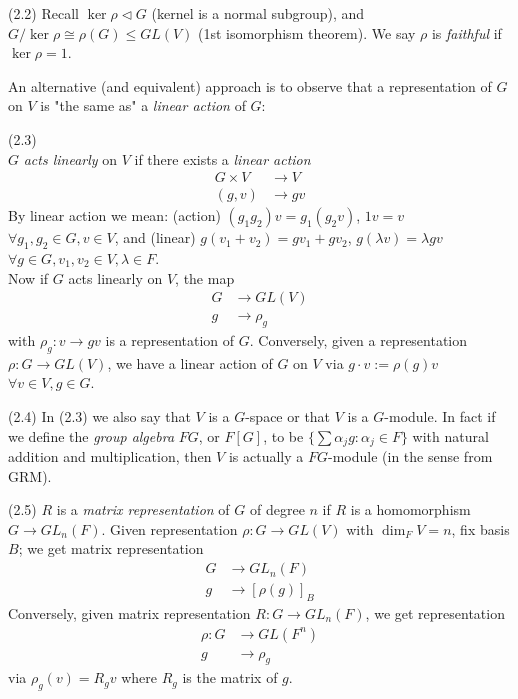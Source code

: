\documentclass[a4paper]{article}
\begin{document}
(2.2) Recall $\ker \rho \triangleleft G$ (kernel is a normal subgroup), and $G/\ker \rho \cong \rho(G) \leq GL(V)$ (1st isomorphism theorem). We say $\rho$ is \emph{faithful} if $\ker \rho = 1$.

An alternative (and equivalent) approach is to observe that a representation of $G$ on $V$ is "the same as" a \emph{linear action} of $G$:

\begin{defi} (2.3)\\
$G$ \emph{acts linearly} on $V$ if there exists a \emph{linear action}
\begin{equation*}
\begin{aligned}
G \times V &\to V\\
(g,v) &\to gv
\end{aligned}
\end{equation*}
By linear action we mean: (action) $(g_1 g_2) v = g_1(g_2 v)$, $1v=v$ $\forall g_1,g_2 \in G, v \in V$, and (linear) $g(v_1+v_2) = gv_1+gv_2$, $g(\lambda v) = \lambda gv$ $\forall g \in G, v_1,v_2 \in V, \lambda \in F$.\\
Now if $G$ acts linearly on $V$, the map
\begin{equation*}
\begin{aligned}
G &\to GL(V)\\
g &\to \rho_g
\end{aligned}
\end{equation*}
with $\rho_g:v \to gv$ is a representation of $G$. Conversely, given a representation $\rho: G \to GL(V)$, we have a linear action of $G$ on $V$ via $g \cdot v := \rho(g) v$ $\forall v \in V, g \in G$.
\end{defi}

(2.4) In (2.3) we also say that $V$ is a $G$-space or that $V$ is a $G$-module. In fact if we define the \emph{group algebra} $FG$, or $F[G]$, to be $\{ \sum \alpha_j g: \alpha_j \in F\}$ with natural addition and multiplication, then $V$ is actually a $FG$-module (in the sense from GRM).

(2.5) $R$ is a \emph{matrix representation} of $G$ of degree $n$ if $R$ is a homomorphism $G \to GL_n (F)$. Given representation $\rho:G \to GL(V)$ with $\dim_F V=n$, fix basis $B$; we get matrix representation
\begin{equation*}
\begin{aligned}
G &\to GL_n(F)\\
g &\to [\rho(g)]_B
\end{aligned}
\end{equation*}
Conversely, given matrix representation $R:G \to GL_n(F)$, we get representation
\begin{equation*}
\begin{aligned}
\rho: G &\to GL(F^n)\\
g &\to \rho_g
\end{aligned}
\end{equation*}
via $\rho_g(v) = R_g v$ where $R_g$ is the matrix of $g$.
\end{document}

